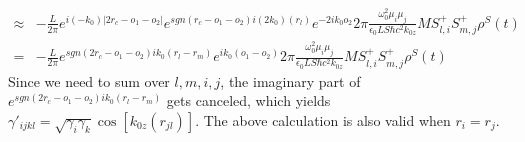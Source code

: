 \documentclass[aps,showpacs,twocolumn,twoside,groupedaddress]{revtex4}
\begin{document}
\begin{widetext}
\begin{equation}
\begin{split}
\approx&-\frac{L}{2\pi}e^{i(-k_{0})|2r_{c}-o_{1}-o_{2}|}e^{sgn(r_{c}-o_{1}-o_{2})i(2k_{0})(r_{l})}e^{-2ik_{0}o_{2}}2\pi\frac{\omega_{0}^{2}\mu_{i}\mu_{j}}{\epsilon_{0}LS\hbar c^{2}k_{0z}}M S_{l,i}^{+}S_{m,j}^{+}\rho^{S}(t)\\
=&-\frac{L}{2\pi}e^{sgn(2r_{c}-o_{1}-o_{2})ik_{0}(r_{l}-r_{m})}e^{ik_{0}(o_{1}-o_{2})}2\pi\frac{\omega_{0}^{2}\mu_{i}\mu_{j}}{\epsilon_{0}LS\hbar c^{2}k_{0z}}M S_{l,i}^{+}S_{m,j}^{+}\rho^{S}(t)
\end{split}
\end{equation}
Since we need to sum over $l,m,i,j$, the imaginary part of $e^{sgn(2r_{c}-o_{1}-o_{2})ik_{0}(r_{l}-r_{m})}$ gets canceled, which yields $\gamma'_{ijkl}=\sqrt{\gamma_{i}\gamma_{k}}\cos[k_{0z}(r_{jl})]$. The above calculation is also valid when $r_i=r_j$.


\end{widetext}

%
\end{document}
